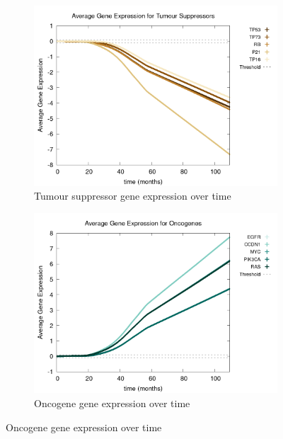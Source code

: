 \documentclass[\main/thesis.tex]{subfiles}
\begin{document}
\begin{figure}
    \centering
    \begin{subfigure}[t]{.65\textwidth}
      \centering
      \includegraphics[width=\textwidth]{images/2_GeneralObservations/Fig2/geneExprAll_TumourSuppressors.png}
      \caption{Tumour suppressor gene expression over time}
      \label{fig:GeneralObservations_TumourSuppressors}
    \end{subfigure}
    \begin{subfigure}[t]{.65\textwidth}
      \centering
      \includegraphics[width=\textwidth]{images/2_GeneralObservations/Fig2/geneExprAll_Oncogenes.png}
      \caption{Oncogene gene expression over time}
      \label{fig:GeneralObservations_Oncogenes}
    \end{subfigure}

\end{figure}
\end{document}
